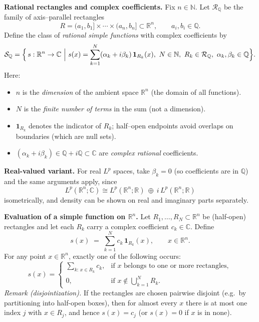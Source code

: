 \begin{problem}[CP-III-0010]
\par\smallskip\noindent\textbf{Rational rectangles and complex coefficients.}\quad
Fix $n\in\mathbb N$. Let $\mathcal R_{\mathbb Q}$ be the family of axis–parallel rectangles
\[
R=(a_1,b_1]\times\cdots\times(a_n,b_n]\subset\mathbb R^{n},
\qquad a_i,b_i\in\mathbb Q.
\]
Define the class of \emph{rational simple functions} with complex coefficients by
\[
\mathcal S_{\mathbb Q}
= \Bigl\{\, s:\mathbb R^{n}\to\mathbb C \ \Big|\
s(x)=\sum_{k=1}^{N} (\alpha_k+i\beta_k)\,\mathbf 1_{R_k}(x),\
N\in\mathbb N,\ R_k\in\mathcal R_{\mathbb Q},\
\alpha_k,\beta_k\in\mathbb Q \Bigr\}.
\]
Here:
\begin{itemize}
	\item $n$ is the \emph{dimension} of the ambient space $\mathbb R^{n}$ (the domain of all functions).
	\item $N$ is the \emph{finite number of terms} in the sum (not a dimension).
	\item $\mathbf 1_{R_k}$ denotes the indicator of $R_k$; half–open endpoints avoid overlaps on boundaries (which are null sets).
	\item $(\alpha_k+i\beta_k)\in\mathbb Q+i\mathbb Q\subset\mathbb C$ are \emph{complex rational} coefficients.
\end{itemize}
\noindent
\textbf{Real-valued variant.} For real $L^p$ spaces, take $\beta_k=0$ (so coefficients are in $\mathbb Q$) and the same arguments apply, since
\[
L^{p}(\mathbb R^{n};\mathbb C)
\cong L^{p}(\mathbb R^{n};\mathbb R)\ \oplus\ i\,L^{p}(\mathbb R^{n};\mathbb R)
\]
isometrically, and density can be shown on real and imaginary parts separately.

\par\smallskip\noindent\textbf{Evaluation of a simple function on $\mathbb R^{n}$.}\quad
Let $R_1,\dots,R_N\subset \mathbb R^{n}$ be (half-open) rectangles and let each $R_k$
carry a complex coefficient $c_k\in\mathbb C$. Define
\[
s(x) \;=\; \sum_{k=1}^{N} c_k\,\mathbf 1_{R_k}(x), \qquad x\in\mathbb R^{n}.
\]
For any point $x\in\mathbb R^{n}$, exactly one of the following occurs:
\[
s(x)=
\begin{cases}
	\displaystyle \sum_{k:\,x\in R_k} c_k, & \text{if $x$ belongs to one or more rectangles},\\[8pt]
	0, & \text{if $x\notin \bigcup_{k=1}^{N} R_k$}.
\end{cases}
\]
\emph{Remark (disjointization).}
If the rectangles are chosen pairwise disjoint (e.g.\ by partitioning into half-open boxes),
then for almost every $x$ there is at most one index $j$ with $x\in R_j$, and hence
$s(x)=c_j$ (or $s(x)=0$ if $x$ is in none).


\end{problem}
